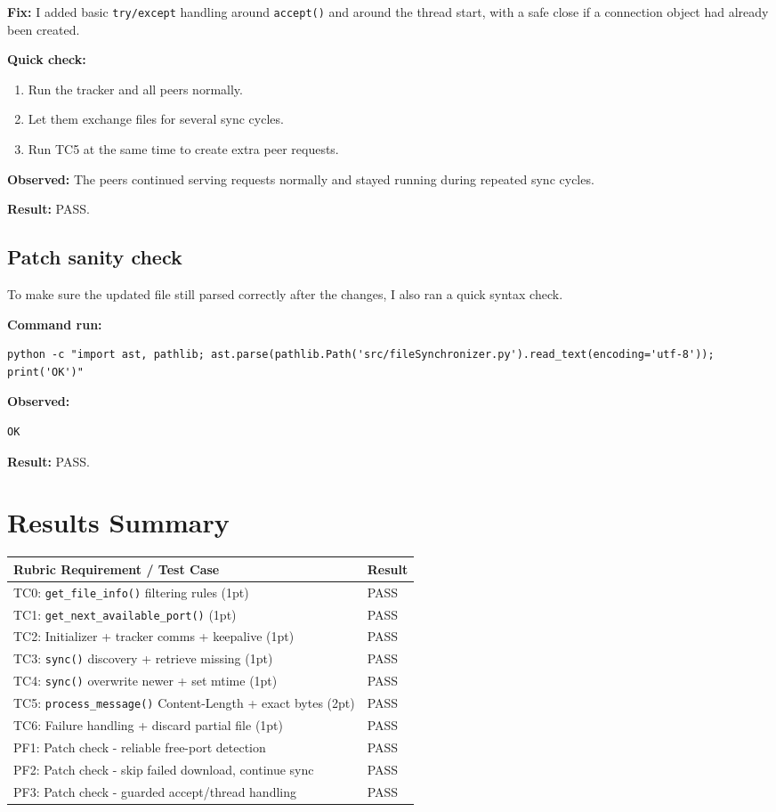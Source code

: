 \documentclass[11pt]{article}
\begin{document}
\textbf{Fix:} I added basic \texttt{try/except} handling around \texttt{accept()} and around the thread start, with a safe close if a connection object had already been created.

\textbf{Quick check:}
\begin{enumerate}[noitemsep]
  \item Run the tracker and all peers normally.
  \item Let them exchange files for several sync cycles.
  \item Run TC5 at the same time to create extra peer requests.
\end{enumerate}

\textbf{Observed:} The peers continued serving requests normally and stayed running during repeated sync cycles.

\textbf{Result:} PASS.

\subsection{Patch sanity check}
To make sure the updated file still parsed correctly after the changes, I also ran a quick syntax check.

\textbf{Command run:}
\begin{lstlisting}
python -c "import ast, pathlib; ast.parse(pathlib.Path('src/fileSynchronizer.py').read_text(encoding='utf-8')); print('OK')"
\end{lstlisting}

\textbf{Observed:}
\begin{lstlisting}
OK
\end{lstlisting}

\textbf{Result:} PASS.

\section{Results Summary}
\begin{center}
\begin{tabular}{ll}
\toprule
Rubric Requirement / Test Case & Result \\
\midrule
TC0: \texttt{get\_file\_info()} filtering rules (1pt) & PASS \\
TC1: \texttt{get\_next\_available\_port()} (1pt) & PASS \\
TC2: Initializer + tracker comms + keepalive (1pt) & PASS \\
TC3: \texttt{sync()} discovery + retrieve missing (1pt) & PASS \\
TC4: \texttt{sync()} overwrite newer + set mtime (1pt) & PASS \\
TC5: \texttt{process\_message()} Content-Length + exact bytes (2pt) & PASS \\
TC6: Failure handling + discard partial file (1pt) & PASS \\
PF1: Patch check - reliable free-port detection & PASS \\
PF2: Patch check - skip failed download, continue sync & PASS \\
PF3: Patch check - guarded accept/thread handling & PASS \\
\bottomrule
\end{tabular}
\end{center}
\end{document}
